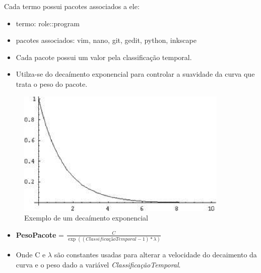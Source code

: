 \begin{frame}
    Cada termo possui pacotes associados a ele:
    \begin{itemize}
        \item termo: role::program
        \item pacotes associados: vim, nano, git, gedit, python, inkscape
    \end{itemize}
\end{frame}

\begin{frame}
    \begin{itemize}
        \item Cada pacote possui um valor pela classificação temporal.
        \item Utilza-se do decaímento exponencial para controlar a suavidade da
curva que trata o peso do pacote.
    \end{itemize}

    \begin{figure}[h]
      \centering
      \includegraphics[width=0.9\textwidth]{figura/decaimento_exponencial.eps}
      \caption{Exemplo de um decaímento exponencial}
      \label{fig:curva_aprendizado}
    \end{figure}
\end{frame}

\begin{frame}
\begin{itemize}
    \item \textbf{PesoPacote} = $\frac{C}{\exp\left(({ClassificaçãoTemporal - 1}) * {\lambda}\right)}$
    \item Onde C e ${\lambda}$ são constantes usadas para alterar a velocidade do
decaimento da curva e o peso dado a variável \textit{ClassificaçãoTemporal}.
\end{itemize}
\end{frame}

